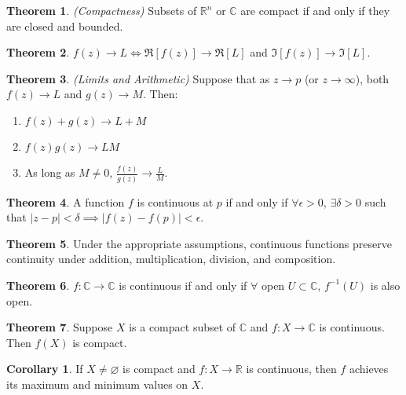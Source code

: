 \documentclass[a4paper]{article}
\theoremstyle{definition}
\newtheorem{theorem}{Theorem}
\newtheorem{corollary}{Corollary}
\begin{document}
	\begin{theorem}
		\emph{(Compactness)}
		Subsets of $\mathbb{R}^n$ or $\mathbb{C}$ are compact if and only if they are closed and bounded.
	\end{theorem}
	
	\begin{theorem}
		$f(z) \rightarrow L \iff \Re{[f(z)]} \rightarrow \Re{[L]}$ and $\Im{[f(z)]} \rightarrow \Im{[L]}$.
	\end{theorem}
	
	\begin{theorem}
		\emph{(Limits and Arithmetic)}
		Suppose that as $z \rightarrow p$ (or $z \rightarrow \infty$), both $f(z) \rightarrow L$ and $g(z) \rightarrow M$. Then:
		\begin{enumerate}[label=\alph*.]
			\item $f(z) + g(z) \rightarrow L + M$
			\item $f(z)g(z) \rightarrow LM$
			\item As long as $M \neq 0$, $\frac{f(z)}{g(z)} \rightarrow \frac{L}{M}.$
		\end{enumerate}
	\end{theorem}
	
	\begin{theorem}
		A function $f$ is continuous at $p$ if and only if $\forall \epsilon > 0$, $\exists \delta > 0$ such that $|z - p| < \delta \implies |f(z) - f(p)| < \epsilon$.
	\end{theorem}
	
	\begin{theorem}
		Under the appropriate assumptions, continuous functions preserve continuity under addition, multiplication, division, and composition.
	\end{theorem}
	
	\begin{theorem}
		$f: \mathbb{C} \rightarrow \mathbb{C}$ is continuous if and only if $\forall$ open $U \subset \mathbb{C}$, $f^{-1}(U)$ is also open.
	\end{theorem}
	
	\begin{theorem}
		Suppose $X$ is a compact subset of $\mathbb{C}$ and $f : X \rightarrow \mathbb{C}$ is continuous. Then $f(X)$ is compact.
	\end{theorem}
	
	\begin{corollary}
		If $X \neq \varnothing$ is compact and $f : X \rightarrow \mathbb{R}$ is continuous, then $f$ achieves its maximum and minimum values on $X$.
	\end{corollary}
	
\end{document}
